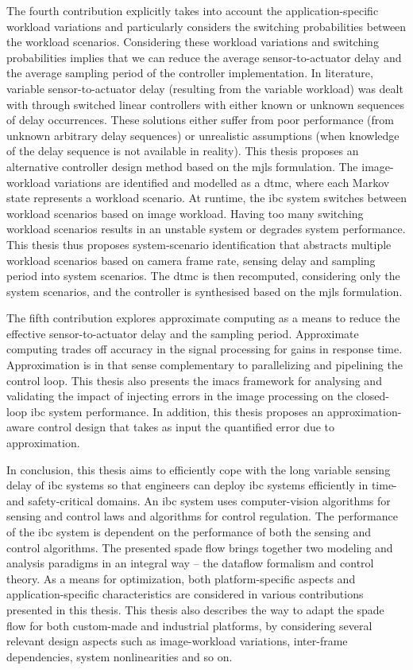 The fourth contribution explicitly takes into account the application-specific workload variations and particularly considers the switching probabilities between the workload scenarios.
Considering these workload variations and switching probabilities implies that we can reduce the average sensor-to-actuator delay and the average sampling period of the controller implementation. 
In literature, variable sensor-to-actuator delay (resulting from the variable workload) was dealt with through switched linear controllers with either known or unknown sequences of delay occurrences. These solutions either suffer from poor performance (from unknown arbitrary delay sequences) or unrealistic assumptions (when knowledge of the delay sequence is not available in reality). 
This thesis proposes an alternative controller design method based on the \gls{mjls} formulation.
The image-workload variations are identified and modelled as a \gls{dtmc}, where each Markov state represents a workload scenario.
At runtime, the \gls{ibc} system switches between workload scenarios based on image workload. Having too many switching workload scenarios results in an unstable system or degrades system performance. 
This thesis thus proposes system-scenario identification that abstracts multiple workload scenarios based on camera frame rate, sensing delay and sampling period into system scenarios. The \gls{dtmc} is then recomputed, considering only the system scenarios, and the controller is synthesised based on the \gls{mjls} formulation.

The fifth contribution explores approximate computing as a means to reduce the effective sensor-to-actuator delay and the sampling period.
Approximate computing trades off accuracy in the signal processing for gains in response time.  Approximation is in that sense complementary to parallelizing and pipelining the control loop.
This thesis also presents the \gls{imacs} framework for analysing and validating the impact of injecting errors in the image processing on the closed-loop \gls{ibc} system performance.
In addition, this thesis proposes an approximation-aware control design that takes as input the quantified error due to approximation.

In conclusion, this thesis aims to efficiently cope with the long variable sensing delay of \gls{ibc} systems so that engineers can deploy \gls{ibc} systems efficiently in time- and safety-critical domains. An \gls{ibc} system uses computer-vision algorithms for sensing and control laws and algorithms for control regulation. The performance of the \gls{ibc} system is dependent on the performance of both the sensing and control algorithms. The presented \gls{spade} flow brings together two modeling and analysis paradigms in an integral way -- the dataflow formalism and control theory. As a means for optimization, both platform-specific aspects and application-specific characteristics are considered in various contributions presented in this thesis. This thesis also describes the way to adapt the \gls{spade} flow for both custom-made and industrial platforms, by considering several relevant design aspects such as image-workload variations, inter-frame dependencies, system nonlinearities and so on. 

